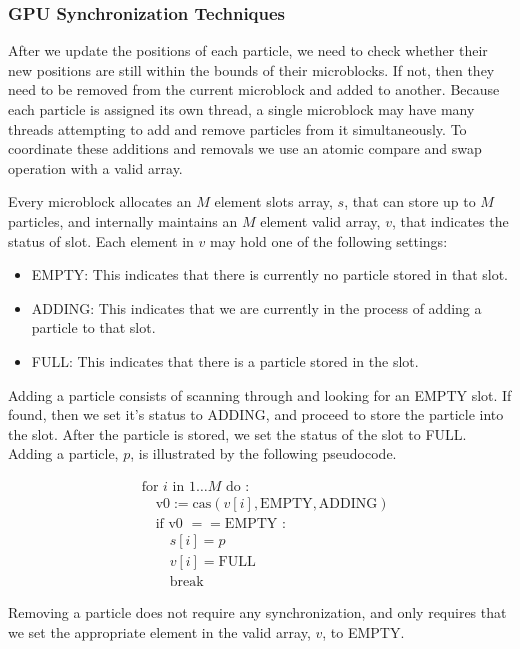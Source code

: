 \documentclass[11pt]{article} %
\begin{document}
\subsubsection{GPU Synchronization Techniques}
After we update the positions of each particle, we need to check whether
their new positions are still within the bounds of their microblocks.
If not, then they need to be removed from the current microblock and
added to another. Because each particle is assigned its own thread,
a single microblock may have many threads attempting to add and remove
particles from it simultaneously. To coordinate these additions and
removals we use an atomic compare and swap operation with a valid
array.

Every microblock allocates an $M$ element slots array, $s$, that
can store up to $M$ particles, and internally maintains an $M$ element
valid array, $v$, that indicates the status of slot. Each element
in $v$ may hold one of the following settings:
\begin{itemize}
\item EMPTY: This indicates that there is currently no particle stored in
that slot.
\item ADDING: This indicates that we are currently in the process of adding
a particle to that slot.
\item FULL: This indicates that there is a particle stored in the slot.
\end{itemize}
Adding a particle consists of scanning through and looking for an
EMPTY slot. If found, then we set it's status to ADDING, and proceed
to store the particle into the slot. After the particle is stored,
we set the status of the slot to FULL. Adding a particle, $p$, is
illustrated by the following pseudocode.

\[
\begin{aligned} & \text{for }i\text{ in }1\ldots M\text{ do :}\\
 & \quad\text{v0}:=\text{cas}(v[i],\text{EMPTY},\text{ADDING})\\
 & \quad\text{if v0 }==\text{EMPTY :}\\
 & \quad\quad s[i]=p\\
 & \quad\quad v[i]=\text{FULL}\\
 & \quad\quad\text{break}
\end{aligned}
\]


Removing a particle does not require any synchronization, and only
requires that we set the appropriate element in the valid array, $v$,
to EMPTY.
\end{document}
